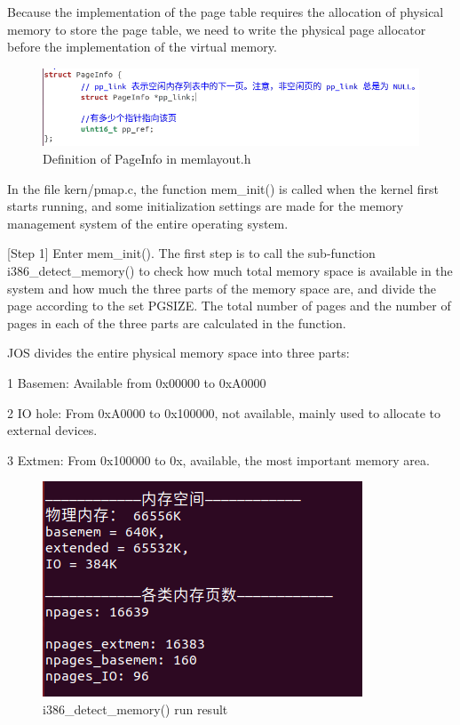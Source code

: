 Because the implementation of the page table requires the allocation of physical memory to store the page table, we need to write the physical page allocator before the implementation of the virtual memory.
\begin{figure}[H]
\centering
\includegraphics[width=0.8\linewidth]{figure/PageInfo}
\caption{Definition of PageInfo in memlayout.h}
\end{figure}


In the file kern/pmap.c, the function mem\_init() is called when the kernel first starts running, and some initialization settings are made for the memory management system of the entire operating system.

[Step 1] Enter mem\_init(). The first step is to call the sub-function i386\_detect\_memory() to check how much total memory space is available in the system and how much the three parts of the memory space are, and divide the page according to the set PGSIZE. The total number of pages and the number of pages in each of the three parts are calculated in the function.

JOS divides the entire physical memory space into three parts:

1 Basemen: Available from 0x00000 to 0xA0000

2 IO hole: From 0xA0000 to 0x100000, not available, mainly used to allocate to external devices.

3 Extmen: From 0x100000 to 0x, available, the most important memory area.

\begin{figure}[H]
\centering
\includegraphics[width=0.8\linewidth]{figure/i386_detect_memory}
\caption{i386\_detect\_memory() run result}
\end{figure}

